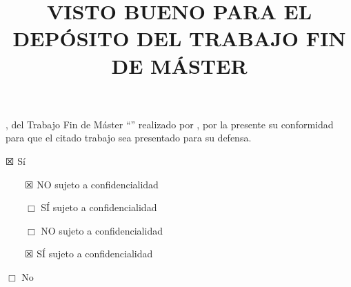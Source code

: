 %

\title{VISTO BUENO \MakeUppercase{\wordDelOrDeLos{}
    \wordTutorOrTutores} PARA EL DEPÓSITO DEL TRABAJO FIN DE MÁSTER} 
\date{}                                            %


{\Large
\maketitle 

\thispagestyle{empty}


\myAdvisorsWithDonOrDona, \wordTutorOrTutores{} del Trabajo Fin de Máster
``\myBookTitle'' realizado por \wordDonOrDonaAutor{} \myAuthorFullName, por la
presente \wordDaOrDan{} su conformidad para que el citado trabajo sea
presentado para su defensa.

\vspace{1cm}

$\XBox$ Sí

{
  \vspace{0.5cm}
  {
    ~~~~$\XBox$ NO sujeto a confidencialidad
    
    \vspace{0.5cm}
    
    ~~~~$\Box$ SÍ sujeto a confidencialidad
    
  }
  {
    ~~~~$\Box$ NO sujeto a confidencialidad
    
    \vspace{0.5cm}
    
    ~~~~$\XBox$ SÍ sujeto a confidencialidad
    
  }
}
{
}

\vspace{0.5cm}

$\Box$ No

\vspace{2cm}


\vspace{4cm}


}


